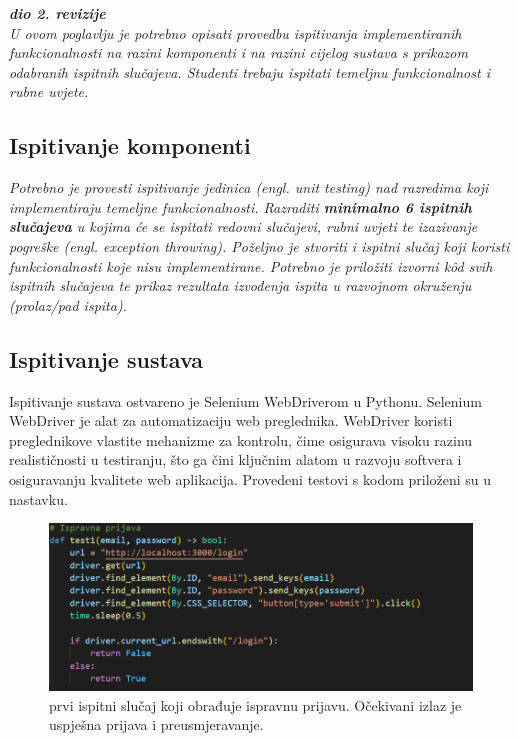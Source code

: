 			\textbf{\textit{dio 2. revizije}}\\
			
			 \textit{U ovom poglavlju je potrebno opisati provedbu ispitivanja implementiranih funkcionalnosti na razini komponenti i na razini cijelog sustava s prikazom odabranih ispitnih slučajeva. Studenti trebaju ispitati temeljnu funkcionalnost i rubne uvjete.}
	
			
			\subsection{Ispitivanje komponenti}
			\textit{Potrebno je provesti ispitivanje jedinica (engl. unit testing) nad razredima koji implementiraju temeljne funkcionalnosti. Razraditi \textbf{minimalno 6 ispitnih slučajeva} u kojima će se ispitati redovni slučajevi, rubni uvjeti te izazivanje pogreške (engl. exception throwing). Poželjno je stvoriti i ispitni slučaj koji koristi funkcionalnosti koje nisu implementirane. Potrebno je priložiti izvorni kôd svih ispitnih slučajeva te prikaz rezultata izvođenja ispita u razvojnom okruženju (prolaz/pad ispita). }
			
			 

			\subsection{Ispitivanje sustava}
Ispitivanje sustava ostvareno je Selenium WebDriverom u Pythonu. Selenium WebDriver je alat za automatizaciju web preglednika. WebDriver koristi preglednikove vlastite mehanizme za kontrolu, čime osigurava visoku razinu realističnosti u testiranju, što ga čini ključnim alatom u razvoju softvera i osiguravanju kvalitete web aplikacija. Provedeni testovi s kodom priloženi su u nastavku.
\break

\begin{figure}[htp]
    \caption{prvi ispitni slučaj koji obrađuje ispravnu prijavu. Očekivani izlaz je uspješna prijava i preusmjeravanje.}
    \includegraphics[scale=0.5]{dijagrami/test1.png}
    \centering
    
\end{figure}
\break

